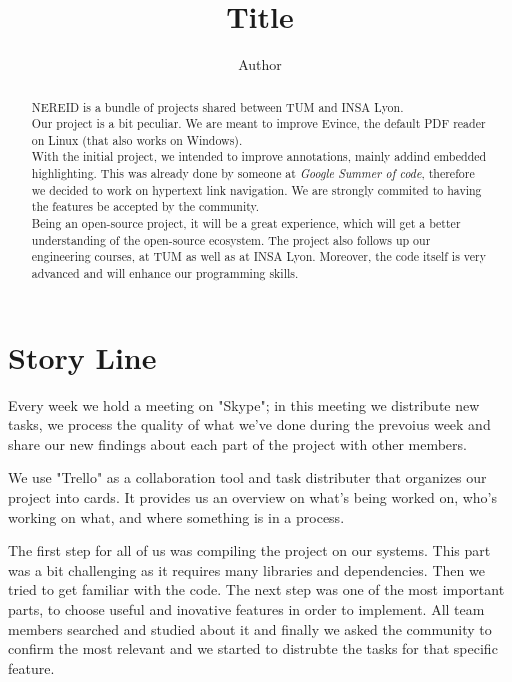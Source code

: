 \documentclass{article}%
\begin{document}
\title{ Title }
\author[]{ Author}
\maketitle


\begin{abstract}

NEREID is a bundle of projects shared between TUM and INSA Lyon. \\

Our project is a bit peculiar. We are meant to improve Evince, the default PDF
reader on Linux (that also works on Windows).\\

With the initial project, we intended to improve annotations, mainly addind
embedded highlighting. This was already done by someone at \emph{Google Summer
of code}, therefore we decided to work on hypertext link navigation. We are
strongly commited to having the features be accepted by the community. \\

Being an open-source project, it will be a great experience, which will get a
better understanding of the open-source ecosystem. The project also follows up
our engineering courses, at TUM as well as at INSA Lyon. Moreover, the code
itself is very advanced and will enhance our programming skills.

\end{abstract}

\newpage
\section{Story Line}
Every week we hold a meeting on "Skype"; in this meeting we distribute new tasks, we process the quality of what we've done during the prevoius week and share our new findings about each part of the project with other members.

We use "Trello" as a collaboration tool and task distributer that organizes our project into cards. It provides us an overview on what's being worked on, who's working on what, and where something is in a process.

The first step for all of us was compiling the project on our systems. This part was a bit challenging as it requires many libraries and dependencies. Then we tried to get familiar with the code. The next step was one of the most important parts, to choose useful and inovative features in order to implement. All team members searched and studied about it and finally we asked the community to confirm the most relevant and we started to distrubte the tasks for that specific feature.
\end{document}
